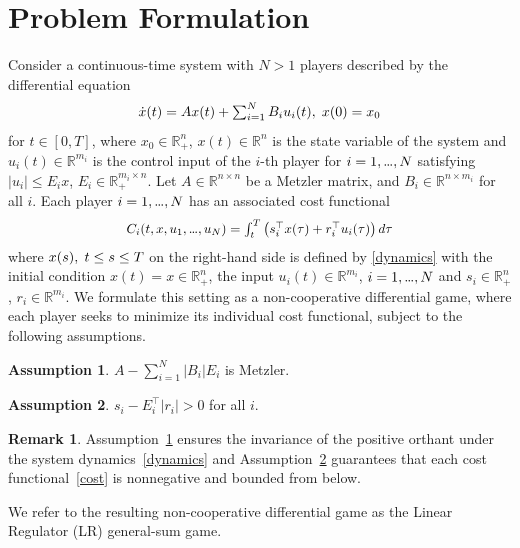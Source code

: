 \documentclass[letterpaper, 10 pt, conference]{ieeeconf}
\newcommand\mydots{\hbox to 0.7em{.\hss.\hss.}}
\theoremstyle{definition}
\newtheorem{ass}{Assumption}
\newtheorem{rem}{Remark}
\begin{document}
\section{Problem Formulation}
Consider a continuous-time system with $N>1$ players described by the differential equation
\begin{align}\label{dynamics}
    \dot x(t)= Ax(t)+ \textstyle\sum\nolimits_{i=1}^N B_i u_i (t), \hspace{1mm} x(0)=x_0
\end{align}
for $t\in [0, T]$, where $x_0 \in \mathbb R^n_+$, $x(t)\in \mathbb R^n$ is the state variable of the system and $u_i(t)\in \mathbb R^{m_i}$ is the control input of the $i$-th player for $i=1,\mydots, N$ satisfying $|u_i|\leq E_ix$, $E_i\in \mathbb R^{{m_i} \times n}_+$. Let $A\in \mathbb R^{n\times n} $ be a Metzler matrix, and $B_i\in \mathbb R^{n \times m_i}$ for all $i$. Each player $i=1,\mydots, N$ has an associated cost functional
\begin{align}\label{cost}
    \scalebox{.94}{$C_i(t, x, u_1,\mydots,u_N)= \int_t^T \left( s_i^{\top}x(\tau)+ r_i^{\top} u_i(\tau) \right) d\tau$}
\end{align}
where $x(s), \hspace{1mm} t\leq s \leq T$ on the right-hand side is defined by \eqref{dynamics} with the initial condition $x(t)=x\in \mathbb R^n_+$, the input $u_i(t)\in \mathbb R^{m_i}$, $i=1,\mydots,N$ and $s_i \in \mathbb R^n_+$, $r_i\in \mathbb R^{m_i}$. We formulate this setting as a non-cooperative differential game, where each player seeks to minimize its individual cost functional, subject to the following assumptions.
\begin{ass}\label{ass_pos_dyn}
    $A-\sum_{i=1}^N |B_i|E_i$ is Metzler.
\end{ass}
\begin{ass}\label{ass_nonneg_cost}
    $s_i-E^{\top}_i|r_i|>0$ for all $i$.
\end{ass}
\begin{rem}\label{rem_ass} Assumption~\ref{ass_pos_dyn} ensures the invariance of the positive orthant under the system dynamics~\eqref{dynamics} and Assumption~\ref{ass_nonneg_cost} guarantees that each cost functional~\eqref{cost} is nonnegative and bounded from below.
\end{rem}
We refer to the resulting non-cooperative differential game as the Linear Regulator (LR) general-sum game. %
\end{document}
